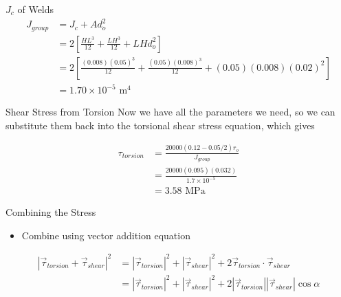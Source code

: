 \documentclass[10pt, svgnames]{beamer}
\begin{document}
\begin{frame}[label={sec:org038c58c}]{\(J_{c}\) of Welds}
\begin{align*}
  J_{group} &= J_c + A d_o^2 \\
            &= 2 \left[ \frac{HL^3}{12} +\frac{LH^3}{12} + LHd_o^2 \right] \\
            &= 2 \left[ \frac{(0.008)(0.05)^3}{12} + \frac{(0.05)(0.008)^3}{12} + (0.05)(0.008)(0.02)^2 \right] \\
            &= 1.70 \times 10^{-5} \text{ m}^4
\end{align*}
\end{frame}

\begin{frame}[label={sec:orgec17f80}]{Shear Stress from Torsion}
Now we have all the parameters we need, so we can substitute them back into the torsional shear stress equation, which gives

\begin{align*}
  \tau_{torsion} &= \frac{20000(0.12-0.05/2) r_o}{J_{group}} \\
                 &= \frac{20000(0.095)(0.032)}{1.7 \times 10^{-5}} \\
                 &= 3.58 \text{ MPa}
\end{align*}
\end{frame}

\begin{frame}[label={sec:org402b9da}]{Combining the Stress}
\begin{itemize}
  \item Combine using vector addition equation
\end{itemize}
\begin{align*}
  \left| \vec{\tau}_{torsion} + \vec{\tau}_{shear} \right|^2 &= \left| \vec{\tau}_{torsion} \right|^2 + \left| \vec{\tau}_{shear} \right|^2 + 2 \vec{\tau}_{torsion} \cdot \vec{\tau}_{shear} \\
                                                             &= \left| \vec{\tau}_{torsion} \right|^2 + \left| \vec{\tau}_{shear} \right|^2 + 2 \left| \vec{\tau}_{torsion} \right| \left| \vec{\tau}_{shear} \right| \cos \alpha
\end{align*}
\end{frame}
\end{document}
